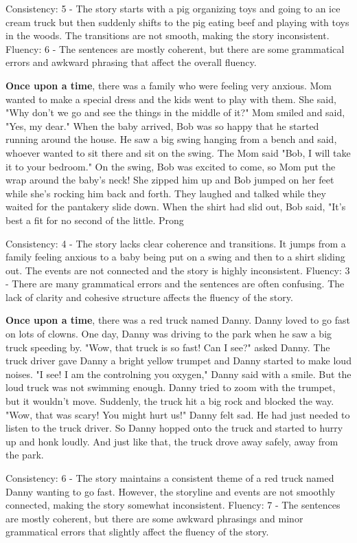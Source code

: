 \documentclass{article}
\begin{document}
Consistency: 5 - The story starts with a pig organizing toys and going to an ice cream truck but then suddenly shifts to the pig eating beef and playing with toys in the woods. The transitions are not smooth, making the story inconsistent.
Fluency: 6 - The sentences are mostly coherent, but there are some grammatical errors and awkward phrasing that affect the overall fluency.

\textbf{Once upon a time}, there was a family who were feeling very anxious. Mom wanted to make a special dress and the kids went to play with them. She said, "Why don't we go and see the things in the middle of it?" Mom smiled and said, "Yes, my dear." When the baby arrived, Bob was so happy that he started running around the house. He saw a big swing hanging from a bench and said, whoever wanted to sit there and sit on the swing. The Mom said "Bob, I will take it to your bedroom." On the swing, Bob was excited to come, so Mom put the wrap around the baby's neck! She zipped him up and Bob jumped on her feet while she's rocking him back and forth. They laughed and talked while they waited for the pantakery slide down. When the shirt had slid out, Bob said, "It's best a fit for no second of the little. Prong

Consistency: 4 - The story lacks clear coherence and transitions. It jumps from a family feeling anxious to a baby being put on a swing and then to a shirt sliding out. The events are not connected and the story is highly inconsistent.
Fluency: 3 - There are many grammatical errors and the sentences are often confusing. The lack of clarity and cohesive structure affects the fluency of the story.

\textbf{Once upon a time}, there was a red truck named Danny. Danny loved to go fast on lots of clowns. One day, Danny was driving to the park when he saw a big truck speeding by. "Wow, that truck is so fast! Can I see?" asked Danny. The truck driver gave Danny a bright yellow trumpet and Danny started to make loud noises. "I see! I am the controlning you oxygen," Danny said with a smile. But the loud truck was not swimming enough. Danny tried to zoom with the trumpet, but it wouldn't move. Suddenly, the truck hit a big rock and blocked the way. "Wow, that was scary! You might hurt us!" Danny felt sad. He had just needed to listen to the truck driver. So Danny hopped onto the truck and started to hurry up and honk loudly. And just like that, the truck drove away safely, away from the park.

Consistency: 6 - The story maintains a consistent theme of a red truck named Danny wanting to go fast. However, the storyline and events are not smoothly connected, making the story somewhat inconsistent.
Fluency: 7 - The sentences are mostly coherent, but there are some awkward phrasings and minor grammatical errors that slightly affect the fluency of the story.
\end{document}
